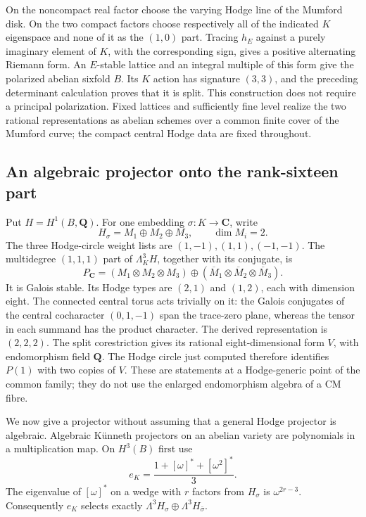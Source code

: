 On the noncompact real factor choose the varying Hodge line of the
Mumford disk.  On the two compact factors choose respectively all of
the indicated $K$ eigenspace and none of it as the $(1,0)$ part.
Tracing $h_E$ against a purely imaginary element of $K$, with the
corresponding sign, gives a positive alternating Riemann form.
An $E$-stable lattice and an integral multiple of this form give the
polarized abelian sixfold $B$.  Its $K$ action has signature $(3,3)$,
and the preceding determinant calculation proves that it is split.
This construction does not require a principal polarization.
Fixed lattices and sufficiently fine level realize the two rational
representations as abelian schemes over a common finite cover of the
Mumford curve; the compact central Hodge data are fixed throughout.

\subsection{An algebraic projector onto the rank-sixteen part}

Put $H=H^1(B,\mathbf Q)$.  For one embedding $\sigma:K\to\mathbf C$,
write
\[
 H_\sigma=M_1\oplus M_2\oplus M_3,\qquad \dim M_i=2.
\]
The three Hodge-circle weight lists are $(1,-1),(1,1),(-1,-1)$.
The multidegree $(1,1,1)$ part of $\Lambda_K^3H$, together with its
conjugate, is
\begin{equation}
 P_{\mathbf C}=(M_1\otimes M_2\otimes M_3)
       \oplus(\overline M_1\otimes\overline M_2\otimes\overline M_3).
 \label{eq:mumford-rank16}
\end{equation}
It is Galois stable.  Its Hodge types are $(2,1)$ and $(1,2)$, each
with dimension eight.  The connected central torus acts trivially on
it: the Galois conjugates of the central cocharacter $(0,1,-1)$ span
the trace-zero plane, whereas the tensor in each summand has the
product character.  The derived representation is $(2,2,2)$.
The split corestriction gives its rational eight-dimensional form
$V$, with endomorphism field $\mathbf Q$.  The Hodge circle just
computed therefore identifies $P(1)$ with two copies of $V$.
These are statements at a Hodge-generic point of the common family;
they do not use the enlarged endomorphism algebra of a CM fibre.

We now give a projector without assuming that a general Hodge
projector is algebraic.  Algebraic K\"unneth projectors on an abelian
variety are polynomials in a multiplication map.  On $H^3(B)$ first use
\[
 e_K=\frac{1+[\omega]^*+[\omega^2]^*}{3}.
\]
The eigenvalue of $[\omega]^*$ on a wedge with $r$ factors from
$H_\sigma$ is $\omega^{2r-3}$.  Consequently $e_K$ selects exactly
$\Lambda^3H_\sigma\oplus\Lambda^3H_{\bar\sigma}$.

